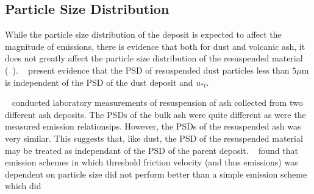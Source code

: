 
%


\subsection{Particle Size Distribution}

While the particle size distribution of the deposit is expected to affect the magnitude of emissions, there is evidence that
both for dust and volcanic ash, it does not greatly affect the particle size distribution of the resuspended material (~\citep{Mahowald14,DRI}).
~\cite{Kok11, Kok11b, Mahowald14} present evidence that the PSD of resuspended dust particles less than $5\mu\mathrm{m}$ is independent of the PSD of the dust deposit and $u_{*t}$.

~\cite{DRI} conducted laboratory measurements of resuspension of ash collected from two different ash deposits. The PSDs of the bulk ash were quite different 
as were the measured emission relationsips. However, the PSDs of the resuspended ash was very similar. This suggests that, like dust, the PSD of the resuspended material may be treated as independant of the PSD of the parent deposit. 
~\cite{Folch14} found that emission schemes in which threshold friction velocity (and thus emissions) was dependent on particle size did not perform better than
a simple emission scheme which did

